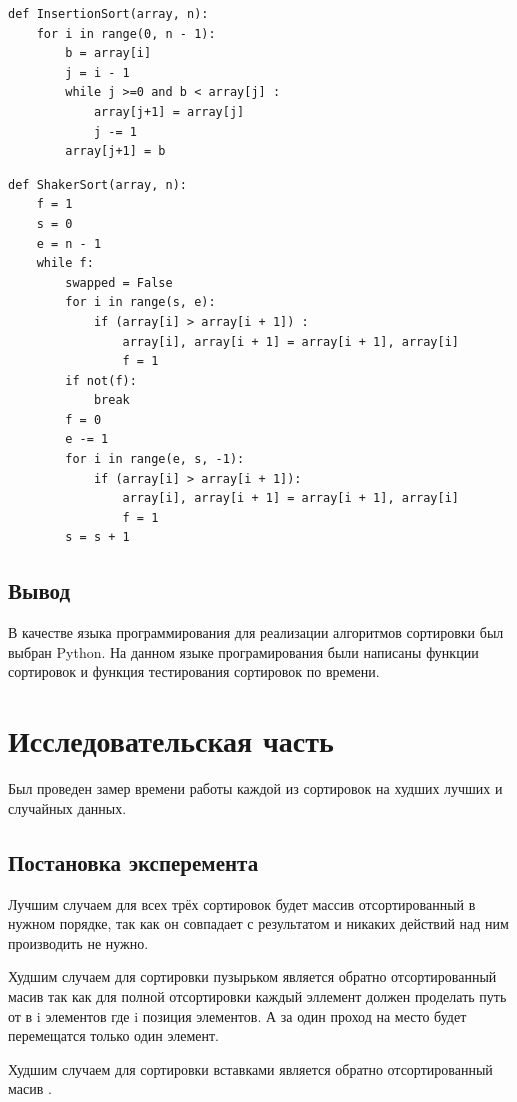 \documentclass[12pt]{report}
\begin{document}
\begin{lstlisting}[label=some-code,caption=Сортировка вставками]
def InsertionSort(array, n):
    for i in range(0, n - 1):
        b = array[i]
        j = i - 1
        while j >=0 and b < array[j] :
            array[j+1] = array[j]
            j -= 1
        array[j+1] = b
\end{lstlisting}
\newpage
\begin{lstlisting}[label=some-code,caption=Сортировка шейкером]
def ShakerSort(array, n): 
    f = 1
    s = 0
    e = n - 1
    while f: 
        swapped = False 
        for i in range(s, e): 
            if (array[i] > array[i + 1]) : 
                array[i], array[i + 1] = array[i + 1], array[i] 
                f = 1
        if not(f): 
            break
        f = 0
        e -= 1
        for i in range(e, s, -1): 
            if (array[i] > array[i + 1]):
                array[i], array[i + 1] = array[i + 1], array[i] 
                f = 1
        s = s + 1
\end{lstlisting}
\section{Вывод}
В качестве языка программирования для реализации алгоритмов сортировки был выбран Python. На данном языке програмирования были написаны функции сортировок и функция тестирования сортировок по времени.

\chapter{Исследовательская часть}

Был проведен замер времени работы каждой из сортировок на худших лучших и случайных данных.
\section{Постановка эксперемента}
Лучшим случаем для всех трёх сортировок будет массив отсортированный в нужном порядке, так как он совпадает с результатом и никаких действий над ним производить не нужно.

Худшим случаем для сортировки пузырьком является обратно отсортированный масив так как для полной отсортировки каждый эллемент должен проделать путь от в i элементов где i позиция элементов. А за один проход на место будет перемещатся только один элемент.

Худшим случаем для сортировки вставками является обратно отсортированный масив \cite{lit1}.
\end{document}
